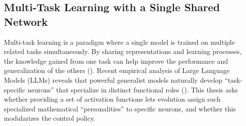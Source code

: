 \documentclass[12pt]{article}
\begin{document}
\subsection{Multi-Task Learning with a Single Shared Network}
\label{subsec:multi-task-learning-with-a-single}


Multi-task learning is a paradigm where a single model is trained on multiple related tasks simultaneously.
By sharing representations and learning processes, the knowledge gained from one task can help improve the performance and generalization of the others (\cite{zhang_survey_2021}).
Recent empirical analysis of Large Language Models (LLMs) reveals that powerful generalist models naturally develop ``task-specific neurons'' that specialize in distinct functional roles (\cite{leng_understanding_2025}).
This thesis asks whether providing a set of activation functions lets evolution assign such specialized mathematical ``personalities'' to specific neurons, and whether this modularizes the control policy.
\end{document}
